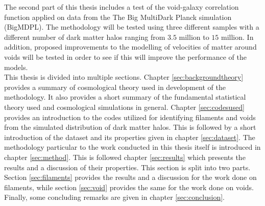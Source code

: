The second part of this thesis includes a test of the void-galaxy correlation function applied on data from the The Big MultiDark Planck simulation (BigMDPL)\cite{Multidark_dataset}. The methodology will be tested using three different samples with a different number of dark matter halos ranging from $3.5$ million to $15$ million. In addition, proposed improvements to the modelling of velocities of matter around voids\cite{Achitouv_streaming} will be tested in order to see if this will improve the performance of the models.\\\indent
This thesis is divided into multiple sections. Chapter \ref{sec:backgroundtheory} provides a summary of cosmological theory used in development of the methodology. It also provides a short summary of the fundamental statistical theory used and cosmological simulations in general. Chapter \ref{sec:codesused} provides an introduction to the codes utilized for identifying filaments and voids from the simulated distribution of dark matter halos. This is followed by a short introduction of the dataset and its properties given in chapter \ref{sec:dataset}. The methodology particular to the work conducted in this thesis itself is introduced in chapter \ref{sec:method}. This is followed chapter \ref{sec:results} which presents the results and a discussion of their properties. This section is split into two parts. Section \ref{sec:filaments} provides the results and a discussion for the work done on filaments, while section \ref{sec:void} provides the same for the work done on voids. Finally, some concluding remarks are given in chapter \ref{sec:conclusion}. 